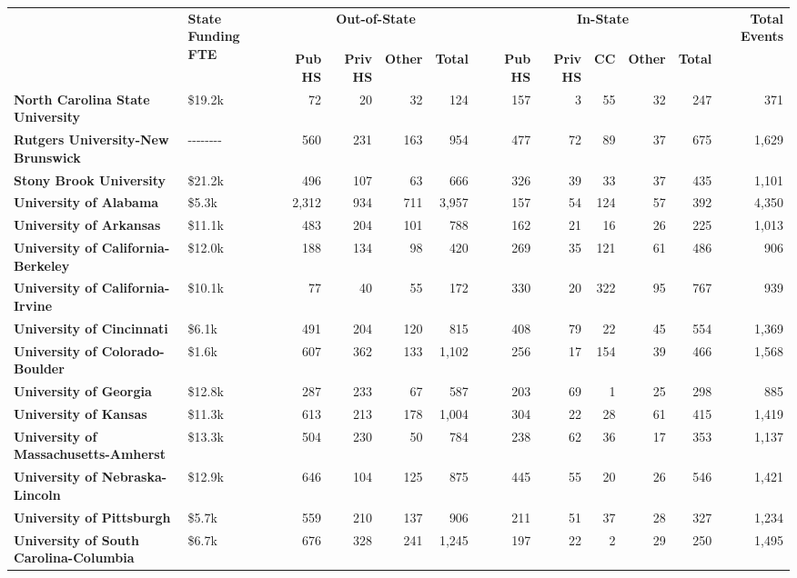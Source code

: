 \begin{tabular*}{\textwidth}{@{\extracolsep{\fill} } llrrrrrrrrrrr}%
&\multirow{2}{0.4in}{\bfseries State Funding FTE}&\multicolumn{4}{c}{\bfseries Out-of-State}&&\multicolumn{5}{c}{\bfseries In-State}&\bfseries Total Events\\%
\textbf{}&\textbf{}&\textbf{Pub HS}&\textbf{Priv HS}&\textbf{Other}&\textbf{Total}&\textbf{}&\textbf{Pub HS}&\textbf{Priv HS}&\textbf{CC}&\textbf{Other}&\textbf{Total}&\textbf{}\\%
\hline%
\textbf{North Carolina State University}&\$19.2k&72&20&32&124&&157&3&55&32&247&371\\%
\textbf{Rutgers University{-}New Brunswick}&{-}{-}{-}{-}{-}{-}{-}{-}&560&231&163&954&&477&72&89&37&675&1,629\\%
\textbf{Stony Brook University}&\$21.2k&496&107&63&666&&326&39&33&37&435&1,101\\%
\textbf{University of Alabama}&\$5.3k&2,312&934&711&3,957&&157&54&124&57&392&4,350\\%
\textbf{University of Arkansas}&\$11.1k&483&204&101&788&&162&21&16&26&225&1,013\\%
\textbf{University of California{-}Berkeley}&\$12.0k&188&134&98&420&&269&35&121&61&486&906\\%
\textbf{University of California{-}Irvine}&\$10.1k&77&40&55&172&&330&20&322&95&767&939\\%
\textbf{University of Cincinnati}&\$6.1k&491&204&120&815&&408&79&22&45&554&1,369\\%
\textbf{University of Colorado{-}Boulder}&\$1.6k&607&362&133&1,102&&256&17&154&39&466&1,568\\%
\textbf{University of Georgia}&\$12.8k&287&233&67&587&&203&69&1&25&298&885\\%
\textbf{University of Kansas}&\$11.3k&613&213&178&1,004&&304&22&28&61&415&1,419\\%
\textbf{University of Massachusetts{-}Amherst}&\$13.3k&504&230&50&784&&238&62&36&17&353&1,137\\%
\textbf{University of Nebraska{-}Lincoln}&\$12.9k&646&104&125&875&&445&55&20&26&546&1,421\\%
\textbf{University of Pittsburgh}&\$5.7k&559&210&137&906&&211&51&37&28&327&1,234\\%
\textbf{University of South Carolina{-}Columbia}&\$6.7k&676&328&241&1,245&&197&22&2&29&250&1,495\\%
\hline%
\end{tabular*}